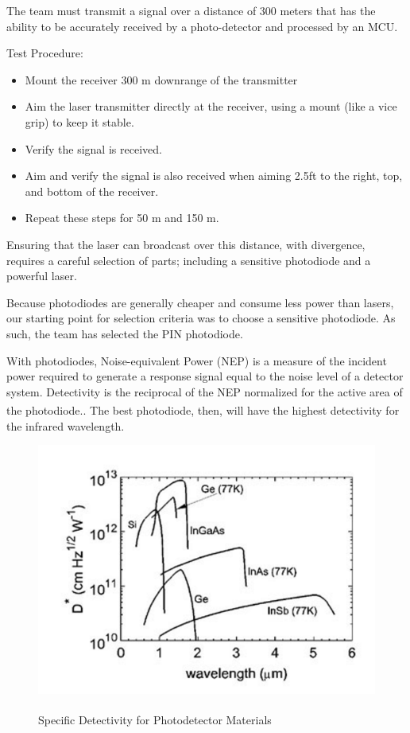 \documentclass[openbib,letterpaper,10pt]{article}
\begin{document}
\begin{spacing}{1.15}
The team must transmit a signal over a distance of 300 meters that has the ability to be accurately received by a photo-detector and processed by an MCU. 

Test Procedure:
 
\begin{itemize}
	\item Mount the receiver 300 m downrange of the transmitter
	\item Aim the laser transmitter directly at the receiver, using a mount (like a vice grip) to keep it stable. 
	\item Verify the signal is received.
	\item Aim and verify the signal is also received when aiming 2.5ft to the right, top, and bottom of the receiver. 
	\item Repeat these steps for 50 m and 150 m. 
\end{itemize}

Ensuring that the laser can broadcast over this distance, with divergence, requires a careful selection of parts; including a sensitive photodiode and a powerful laser. 

Because photodiodes are generally cheaper and consume less power than lasers, our starting point for selection criteria was to choose a sensitive photodiode. As such, the team has selected the PIN photodiode. 

With photodiodes, Noise-equivalent Power (NEP) is a measure of the incident power required to generate a response signal equal to the noise level of a detector system. Detectivity is the reciprocal of the NEP normalized for the active area of the photodiode.\textsuperscript{\cite{Microphotonics}}. The best photodiode, then, will have the highest detectivity for the infrared wavelength.  

\begin{figure} [H]
	\centering
	\includegraphics[scale=0.4]{detectivity-table.png}
	\label{fig:detectivity-table}
	\caption{Specific Detectivity for Photodetector Materials \textsuperscript{\cite{Optical}} \label{fig:detectivity-table}}
\end{figure}


\end{spacing}
\end{document}
